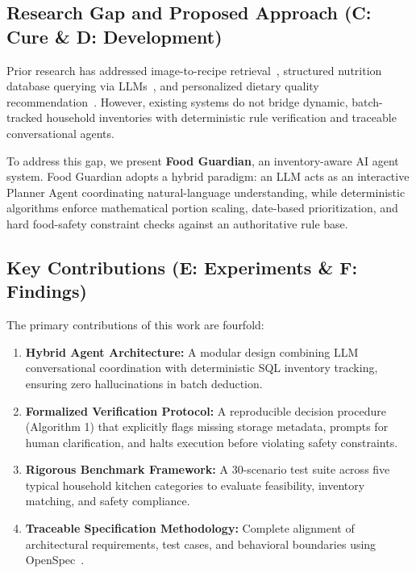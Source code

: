 \subsection{Research Gap and Proposed Approach (C: Cure \& D: Development)}
Prior research has addressed image-to-recipe retrieval~\cite{R4_Liu2025_WACV}, structured nutrition database querying via LLMs~\cite{R5_Vavken2026}, and personalized dietary quality recommendation~\cite{R6_Wang2026}. However, existing systems do not bridge dynamic, batch-tracked household inventories with deterministic rule verification and traceable conversational agents. 

To address this gap, we present \textbf{Food Guardian}, an inventory-aware AI agent system. Food Guardian adopts a hybrid paradigm: an LLM acts as an interactive Planner Agent coordinating natural-language understanding, while deterministic algorithms enforce mathematical portion scaling, date-based prioritization, and hard food-safety constraint checks against an authoritative rule base.

\subsection{Key Contributions (E: Experiments \& F: Findings)}
The primary contributions of this work are fourfold:
\begin{enumerate}
    \item \textbf{Hybrid Agent Architecture:} A modular design combining LLM conversational coordination with deterministic SQL inventory tracking, ensuring zero hallucinations in batch deduction.
    \item \textbf{Formalized Verification Protocol:} A reproducible decision procedure (Algorithm 1) that explicitly flags missing storage metadata, prompts for human clarification, and halts execution before violating safety constraints.
    \item \textbf{Rigorous Benchmark Framework:} A 30-scenario test suite across five typical household kitchen categories to evaluate feasibility, inventory matching, and safety compliance.
    \item \textbf{Traceable Specification Methodology:} Complete alignment of architectural requirements, test cases, and behavioral boundaries using OpenSpec~\cite{T1_OpenSpec2026}.
\end{enumerate}
